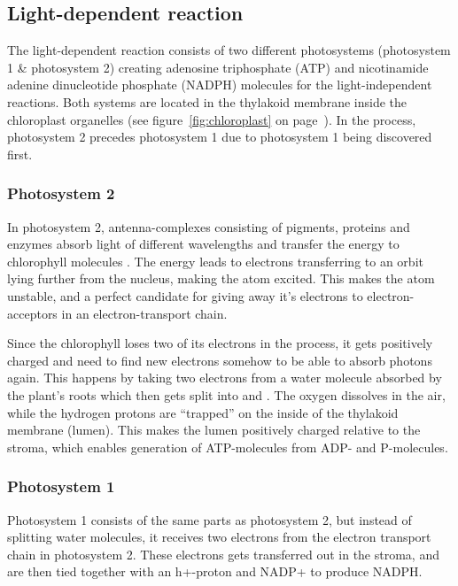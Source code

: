 \subsection{Light-dependent reaction}
The light-dependent reaction consists of two different photosystems (photosystem 1 \& photosystem 2) creating adenosine triphosphate (ATP) and nicotinamide adenine dinucleotide phosphate (NADPH) molecules for the light-independent reactions. Both systems are located in the thylakoid membrane inside the chloroplast organelles (see figure~\ref{fig:chloroplast} on page~\pageref{fig:chloroplast}).  In the process, photosystem 2 precedes photosystem 1 due to photosystem 1 being discovered first. 

\subsubsection{Photosystem 2}
In photosystem 2, antenna-complexes consisting of pigments, proteins and enzymes absorb light of different wavelengths and transfer the energy to chlorophyll molecules \citep{bios}. The energy leads to electrons transferring to an orbit lying further from the nucleus, making the atom excited. This makes the atom unstable, and a perfect candidate for giving away it’s electrons to electron-acceptors in an electron-transport chain.

Since the chlorophyll loses two of its electrons in the process, it gets positively charged and need to find new electrons somehow to be able to absorb photons again. This happens by taking two electrons from a water molecule absorbed by the plant’s roots which then gets split into  and  \citep{bios}. The oxygen dissolves in the air, while the hydrogen protons are “trapped” on the inside of the thylakoid membrane (lumen). This makes the lumen positively charged relative to the stroma, which enables generation of ATP-molecules from ADP- and P-molecules. 

\subsubsection{Photosystem 1}
Photosystem 1 consists of the same parts as photosystem 2, but instead of splitting water molecules, it receives two electrons from the electron transport chain in photosystem 2. These electrons gets transferred out in the stroma, and are then tied together with an h+-proton and NADP+ to produce NADPH.

